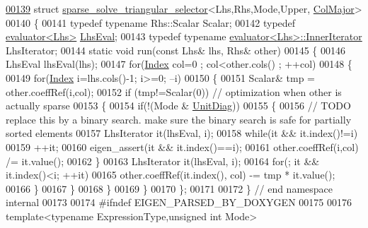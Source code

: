 \begin{DoxyCode}
\hyperlink{struct_eigen_1_1internal_1_1sparse__solve__triangular__selector_3_01_lhs_00_01_rhs_00_01_mode_00_01_upper_00_01_col_major_01_4}{00139} \textcolor{keyword}{struct }\hyperlink{struct_eigen_1_1internal_1_1sparse__solve__triangular__selector}{sparse\_solve\_triangular\_selector}<Lhs,Rhs,Mode,Upper,
      \hyperlink{group__enums_ggaacded1a18ae58b0f554751f6cdf9eb13a0cbd4bdd0abcfc0224c5fcb5e4f6669a}{ColMajor}>
00140 \{
00141   \textcolor{keyword}{typedef} \textcolor{keyword}{typename} Rhs::Scalar Scalar;
00142   \textcolor{keyword}{typedef} \hyperlink{struct_eigen_1_1internal_1_1evaluator}{evaluator<Lhs>} \hyperlink{struct_eigen_1_1internal_1_1evaluator}{LhsEval};
00143   \textcolor{keyword}{typedef} \textcolor{keyword}{typename} \hyperlink{struct_eigen_1_1internal_1_1evaluator}{evaluator<Lhs>::InnerIterator} LhsIterator;
00144   \textcolor{keyword}{static} \textcolor{keywordtype}{void} run(\textcolor{keyword}{const} Lhs& lhs, Rhs& other)
00145   \{
00146     LhsEval lhsEval(lhs);
00147     \textcolor{keywordflow}{for}(\hyperlink{namespace_eigen_a62e77e0933482dafde8fe197d9a2cfde}{Index} col=0 ; col<other.cols() ; ++col)
00148     \{
00149       \textcolor{keywordflow}{for}(\hyperlink{namespace_eigen_a62e77e0933482dafde8fe197d9a2cfde}{Index} i=lhs.cols()-1; i>=0; --i)
00150       \{
00151         Scalar& tmp = other.coeffRef(i,col);
00152         \textcolor{keywordflow}{if} (tmp!=Scalar(0)) \textcolor{comment}{// optimization when other is actually sparse}
00153         \{
00154           \textcolor{keywordflow}{if}(!(Mode & \hyperlink{group__enums_gga39e3366ff5554d731e7dc8bb642f83cdaddb72f888ac85d5a1c52333e54f9374b}{UnitDiag}))
00155           \{
00156             \textcolor{comment}{// TODO replace this by a binary search. make sure the binary search is safe for partially
       sorted elements}
00157             LhsIterator it(lhsEval, i);
00158             \textcolor{keywordflow}{while}(it && it.index()!=i)
00159               ++it;
00160             eigen\_assert(it && it.index()==i);
00161             other.coeffRef(i,col) /= it.value();
00162           \}
00163           LhsIterator it(lhsEval, i);
00164           \textcolor{keywordflow}{for}(; it && it.index()<i; ++it)
00165             other.coeffRef(it.index(), col) -= tmp * it.value();
00166         \}
00167       \}
00168     \}
00169   \}
00170 \};
00171 
00172 \} \textcolor{comment}{// end namespace internal}
00173 
00174 \textcolor{preprocessor}{#ifndef EIGEN\_PARSED\_BY\_DOXYGEN}
00175 
00176 \textcolor{keyword}{template}<\textcolor{keyword}{typename} ExpressionType,\textcolor{keywordtype}{unsigned} \textcolor{keywordtype}{int} Mode>

\end{DoxyCode}
